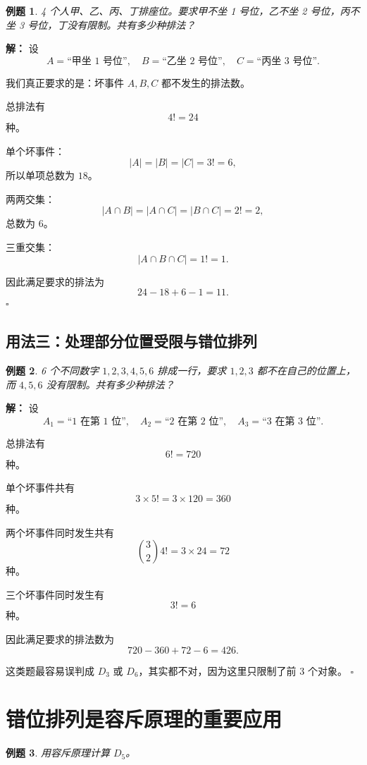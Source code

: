 \documentclass[11pt,a4paper,fontset=fandol]{ctexart}
\theoremstyle{formaltheorem}
\theoremstyle{formalexample}
\newtheorem{example}{例题}[section]
\newenvironment{solution}{\par\noindent\textbf{解：}}{\hfill$\square$\par}
\begin{document}
\begin{example}
4 个人甲、乙、丙、丁排座位。要求甲不坐 1 号位，乙不坐 2 号位，丙不坐 3 号位，丁没有限制。共有多少种排法？
\end{example}

\begin{solution}
设
\[
A=\text{“甲坐 1 号位”},\quad B=\text{“乙坐 2 号位”},\quad C=\text{“丙坐 3 号位”}.
\]

我们真正要求的是：坏事件 $A,B,C$ 都不发生的排法数。

总排法有
\[
4!=24
\]
种。

单个坏事件：
\[
|A|=|B|=|C|=3!=6,
\]
所以单项总数为 $18$。

两两交集：
\[
|A\cap B|=|A\cap C|=|B\cap C|=2!=2,
\]
总数为 $6$。

三重交集：
\[
|A\cap B\cap C|=1!=1.
\]

因此满足要求的排法为
\[
24-18+6-1=11.
\]
\end{solution}

\subsection{用法三：处理部分位置受限与错位排列}

\begin{example}
6 个不同数字 $1,2,3,4,5,6$ 排成一行，要求 $1,2,3$ 都不在自己的位置上，而 $4,5,6$ 没有限制。共有多少种排法？
\end{example}

\begin{solution}
设
\[
A_1=\text{“1 在第 1 位”},\quad A_2=\text{“2 在第 2 位”},\quad A_3=\text{“3 在第 3 位”}.
\]

总排法有
\[
6!=720
\]
种。

单个坏事件共有
\[
3\times 5!=3\times 120=360
\]
种。

两个坏事件同时发生共有
\[
\binom32 4!=3\times 24=72
\]
种。

三个坏事件同时发生有
\[
3!=6
\]
种。

因此满足要求的排法数为
\[
720-360+72-6=426.
\]

这类题最容易误判成 $D_3$ 或 $D_6$，其实都不对，因为这里只限制了前 3 个对象。
\end{solution}

\section{错位排列是容斥原理的重要应用}

\begin{example}
用容斥原理计算 $D_5$。
\end{example}
\end{document}
